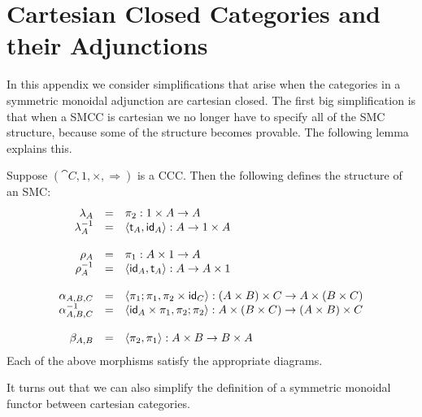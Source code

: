 \section{Cartesian Closed Categories and their Adjunctions}
\label{sec:cartesian_closed_categories_and_symmetric_monoidal_adjunctions}
In this appendix we consider simplifications that arise when the categories
in a symmetric monoidal adjunction are cartesian closed.  The first
big simplification is that when a SMCC is cartesian we no longer have
to specify all of the SMC structure, because some of the structure becomes provable.
The following lemma explains this.

\begin{lemma}
  \label{lemma:CCC-is-SMC}
  Suppose $(\cat{C}, 1, \times, \Rightarrow)$ is a CCC.  Then the
  following defines the structure of an SMC:
  \[
  \begin{array}{rll}
    \lambda_A & = & \pi_2 : 1 \times A \rightarrow A\\
    \lambda^{-1}_A & = & \langle \mathsf{t}_A , \mathsf{id}_A  \rangle : A \rightarrow 1 \times A\\
    \\
    \rho_A & = & \pi_1 : A \times 1 \rightarrow A\\
    \rho^{-1}_A & = & \langle \mathsf{id}_A , \mathsf{t}_A  \rangle : A \rightarrow A \times 1\\
    \\
    \alpha_{A,B,C} & = & \langle \pi_1;\pi_1, \pi_2 \times \mathsf{id}_C \rangle : (A \times B) \times C \rightarrow A \times (B \times C)\\
    \alpha^{-1}_{A,B,C} & = & \langle \mathsf{id}_A \times \pi_1, \pi_2;\pi_2 \rangle : A \times (B \times C) \rightarrow (A \times B) \times C\\
    \\
    \beta_{A,B} & = & \langle \pi_2, \pi_1 \rangle : A \times B \rightarrow B \times A\\
  \end{array}
  \]
  Each of the above morphisms satisfy the appropriate diagrams.
\end{lemma}

It turns out that we can also simplify the definition of a symmetric
monoidal functor between cartesian categories.

